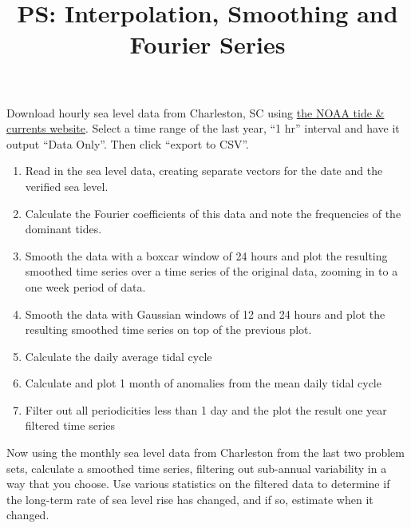 \documentclass{article}
\title{\vspace{-1in} PS: Interpolation, Smoothing and Fourier Series}
\date{}
\newcommand{\be}{\begin{enumerate}}
\newcommand{\ee}{\end{enumerate}}
\begin{document}
\maketitle

\noindent Download hourly sea level data from Charleston, SC using \href{https://tidesandcurrents.noaa.gov/waterlevels.html?id=8665530}{the NOAA tide \& currents website}. Select a time range of the last year, ``1 hr'' interval and have it output ``Data Only''. Then click ``export to CSV''.

\be
\item Read in the sea level data, creating separate vectors for the date and the verified sea level.

\item Calculate the Fourier coefficients of this data and note the frequencies of the dominant tides.

\item Smooth the data with a boxcar window of 24 hours and plot the resulting smoothed time series over a time series of the original data, zooming in to a one week period of data.

\item Smooth the data with Gaussian windows of 12 and 24 hours and plot the resulting smoothed time series on top of the previous plot.

\item Calculate the daily average tidal cycle

\item Calculate and plot 1 month of anomalies from the mean daily tidal cycle

\item Filter out all periodicities less than 1 day and the plot the result one year filtered time series

\ee

\noindent Now using the monthly sea level data from Charleston from the last two problem sets, calculate a smoothed time series, filtering out sub-annual variability in a way that you choose. Use various statistics on the filtered data to determine if the long-term rate of sea level rise has changed, and if so, estimate when it changed.
\end{document}
